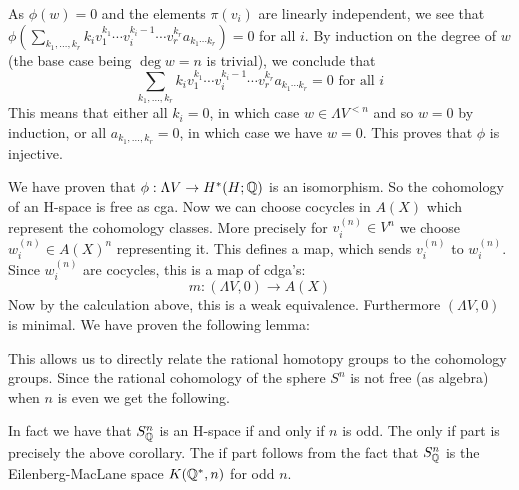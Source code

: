 As $\phi(w) = 0$ and the elements $\pi(v_i)$ are linearly independent, we see that $\phi(\sum_{k_1, \ldots, k_r} k_i v_1^{k_1} \cdots v_i^{k_i - 1} \cdots v_r^{k_r}a_{k_1 \cdots k_r}) = 0$ for all $i$. By induction on the degree of $w$ (the base case being $\deg{w} = n$ is trivial), we conclude that
\[ \sum_{k_1, \ldots, k_r} k_i v_1^{k_1} \cdots v_i^{k_i - 1} \cdots v_r^{k_r}a_{k_1 \cdots k_r} = 0 \text{ for all } i\]
This means that either all $k_i = 0$, in which case $w \in \Lambda V^{<n}$ and so $w = 0$ by induction, or all $a_{k_1, \ldots, k_r} = 0$, in which case we have $w = 0$. This proves that $\phi$ is injective.

We have proven that $\phi : \Lambda V \to H^\ast(H; \mathbb{Q})$ is an isomorphism. So the cohomology of an H-space is free as cga. Now we can choose cocycles in $A(X)$ which represent the cohomology classes. More precisely for $v_i^{(n)} \in V^n$ we choose $w_i^{(n)} \in A(X)^n$ representing it. This defines a map, which sends $v_i^{(n)}$ to $w_i^{(n)}$. Since $w_i^{(n)}$ are cocycles, this is a map of cdga's:
\[ m : (\Lambda V, 0) \to A(X) \]
Now by the calculation above, this is a weak equivalence. Furthermore $(\Lambda V, 0)$ is minimal. We have proven the following lemma:


This allows us to directly relate the rational homotopy groups to the cohomology groups. Since the rational cohomology of the sphere $S^n$ is not free (as algebra) when $n$ is even we get the following.


In fact we have that $S^n_{\mathbb{Q}}$ is an H-space if and only if $n$ is odd. The only if part is precisely the above corollary. The if part follows from the fact that $S^n_{\mathbb{Q}}$ is the Eilenberg-MacLane space $K(\mathbb{Q}^\ast, n)$ for odd $n$.
